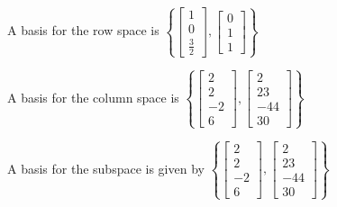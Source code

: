 \documentclass{article}
\begin{document}
\begin{mdframed}
	A basis for the row space is
	$ \left\{
		\begin{bmatrix} 1 \\ 0 \\ \frac{3}{2} \end{bmatrix},
		\begin{bmatrix} 0 \\ 1 \\ 1 \end{bmatrix}
	\right\} $
	
	A basis for the column space is
	$ \left\{
		\begin{bmatrix} 2 \\ 2 \\ -2 \\ 6 \end{bmatrix},
		\begin{bmatrix} 2 \\ 23 \\ -44 \\ 30 \end{bmatrix}
	\right\} $

	A basis for the subspace is given by
	$ \left\{
		\begin{bmatrix} 2 \\ 2 \\ -2 \\ 6 \end{bmatrix},
		\begin{bmatrix} 2 \\ 23 \\ -44 \\ 30 \end{bmatrix}
	\right\} $
\end{mdframed}
\end{document}
